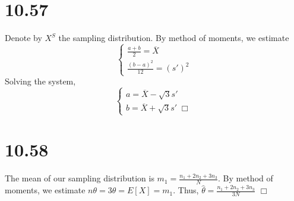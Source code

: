 \documentclass{article}
\begin{document}
\section*{10.57}
Denote by $X^S$ the sampling distribution. By method of moments, we estimate
\begin{equation*}
\begin{cases}
\frac{a+b}{2} = \overline{X}\\
\frac{(b-a)^2}{12} = (s')^2
\end{cases}
\end{equation*}
Solving the system,
\begin{equation*}
\begin{cases}
a = \overline{X} - \sqrt{3}s'\\
b = \overline{X} + \sqrt{3}s' \; \Box
\end{cases}
\end{equation*}

\section*{10.58}
The mean of our sampling distribution is $m_1 = \frac{n_1+2n_2+3n_3}{N}$. By method of moments, we estimate $n\theta = 3\theta = E[X] = m_1$. Thus, $\hat{\theta} = \frac{n_1+2n_2+3n_3}{3N}$ $\Box$
\end{document}
